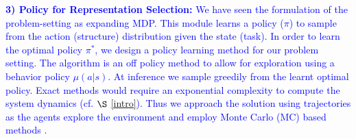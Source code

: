 
\noindent \textcolor{blue}{
\textbf{3) Policy for Representation Selection:}
We have seen the formulation of the problem-setting as expanding MDP. This module learns a policy ($\pi$) to sample from the action (structure) distribution given the state (task). In order to learn the optimal policy $\pi^*$, we design a policy learning method for our problem setting. The algorithm is an off policy method to allow for exploration using a behavior policy $\mu(a|s)$.
At inference we sample greedily from the learnt optimal policy.
Exact methods would require an exponential complexity to compute the system dynamics (cf. $\S$ \ref{intro}). Thus we approach the solution using trajectories as the agents explore the environment and employ Monte Carlo (MC) based methods \cite{sutton2018reinforcement}.
}

